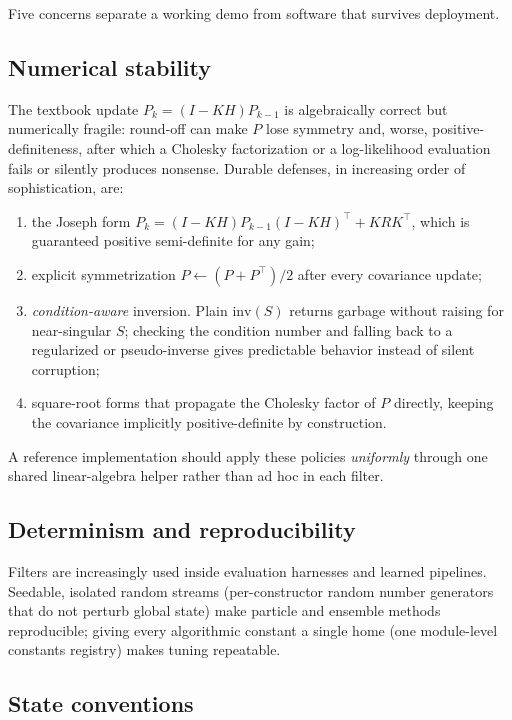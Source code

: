 \documentclass[10pt,conference]{IEEEtran}
\begin{document}
Five concerns separate a working demo from software that survives deployment.

\subsection{Numerical stability}

The textbook update $P_k = (I-KH)P_{k-1}$ is algebraically correct but
numerically fragile: round-off can make $P$ lose symmetry and, worse,
positive-definiteness, after which a Cholesky factorization or a
log-likelihood evaluation fails or silently produces nonsense. Durable
defenses, in increasing order of sophistication, are:
\begin{enumerate}
\item the Joseph form
$P_k = (I-KH)P_{k-1}(I-KH)^{\top} + K R K^{\top}$, which is guaranteed
positive semi-definite for any gain;
\item explicit symmetrization $P \leftarrow (P+P^{\top})/2$ after every
covariance update;
\item \emph{condition-aware} inversion. Plain $\mathrm{inv}(S)$ returns
garbage without raising for near-singular $S$; checking the condition number
and falling back to a regularized or pseudo-inverse gives predictable
behavior instead of silent corruption;
\item square-root forms that propagate the Cholesky factor of $P$
directly, keeping the covariance implicitly positive-definite by
construction.
\end{enumerate}
A reference implementation should apply these policies \emph{uniformly}
through one shared linear-algebra helper rather than ad hoc in each filter.

\subsection{Determinism and reproducibility}

Filters are increasingly used inside evaluation harnesses and learned
pipelines. Seedable, isolated random streams (per-constructor random number
generators that do not perturb global state) make particle and ensemble
methods reproducible; giving every algorithmic constant a single home (one
module-level constants registry) makes tuning repeatable.

\subsection{State conventions}
\end{document}

